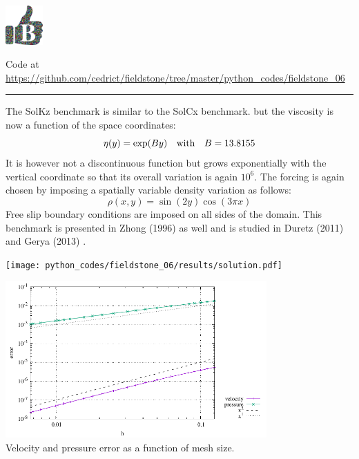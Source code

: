 
\includegraphics[height=1.5cm]{images/pictograms/benchmark}



\begin{center}
\inpython
{\small Code at \url{https://github.com/cedrict/fieldstone/tree/master/python_codes/fieldstone_06}}
\end{center}

\par\noindent\rule{\textwidth}{0.4pt}

The SolKz benchmark \cite{repa87} is similar to the SolCx benchmark.
but the viscosity is now a function of the space coordinates: 
\begin{equation}
\eta(y)=\exp(By) \quad {\rm with} \quad B=13.8155
\end{equation}
It is however not a discontinuous function but grows exponentially with the vertical coordinate so that its overall variation is again $10^6$. 
The forcing is again chosen by imposing a spatially variable density variation as follows:
\begin{equation}
\rho(x,y)=\sin(2y) \cos(3\pi x)
\end{equation}
Free slip boundary conditions are imposed on all sides of the domain.
This benchmark is presented in Zhong (1996) \cite{zhon96} as well and is studied 
in Duretz \etal (2011) \cite{dumg11} and Gerya \etal (2013) \cite{gemd13}.

\begin{center}
\texttt{[image: python\_codes/fieldstone\_06/results/solution.pdf]}
\end{center}

\begin{center}
\includegraphics[width=10cm]{python_codes/fieldstone_06/results/errors.pdf}\\
{\captionfont Velocity and pressure error as a function of mesh size.}
\end{center}
